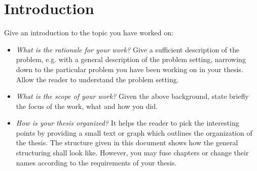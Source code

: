 \chapter{Introduction}
Give an introduction to the topic you have worked on:

\begin{itemize}
 \item \textit{What is the rationale for your work?} Give a sufficient description of the problem, e.g. with a general description of the problem setting, narrowing down to the particular problem you have been working on in your thesis. Allow the reader to understand the problem setting.
 \item \textit{What is the scope of your work?} Given the above background, state briefly the focus of the work, what and how you did.
 \item \textit{How is your thesis organized?} It helps the reader to pick the interesting points by providing a small text or graph which outlines the organization of the thesis. The structure given in this document shows how the general structuring shall look like. However, you may fuse chapters or change their names according to the requirements of your thesis.
\end{itemize}



